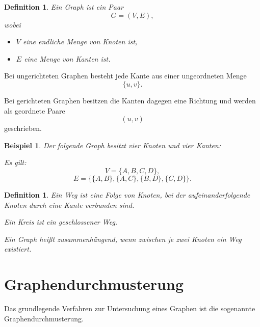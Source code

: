 \documentclass[12pt]{article}
\newtheorem{definition}[satz]{Definition}
\newtheorem{beispiel}[satz]{Beispiel}
\begin{document}
\begin{definition}
Ein Graph ist ein Paar
\[
G=(V,E),
\]
wobei
\begin{itemize}
    \item \(V\) eine endliche Menge von Knoten ist,
    \item \(E\) eine Menge von Kanten ist.
\end{itemize}
\end{definition}

Bei ungerichteten Graphen besteht jede Kante aus einer ungeordneten Menge
\[
\{u,v\}.
\]

Bei gerichteten Graphen besitzen die Kanten dagegen eine Richtung und werden als geordnete Paare
\[
(u,v)
\]
geschrieben.

\begin{beispiel}
Der folgende Graph besitzt vier Knoten und vier Kanten:

\begin{center}
\end{center}

Es gilt:
\[
V=\{A,B,C,D\},
\]
\[
E=\{\{A,B\},\{A,C\},\{B,D\},\{C,D\}\}.
\]
\end{beispiel}

\begin{definition}
Ein Weg ist eine Folge von Knoten, bei der aufeinanderfolgende Knoten durch eine Kante verbunden sind.

Ein Kreis ist ein geschlossener Weg.

Ein Graph heißt zusammenhängend, wenn zwischen je zwei Knoten ein Weg existiert.
\end{definition}

\section{Graphendurchmusterung}

Das grundlegende Verfahren zur Untersuchung eines Graphen ist die sogenannte Graphendurchmusterung.
\end{document}
